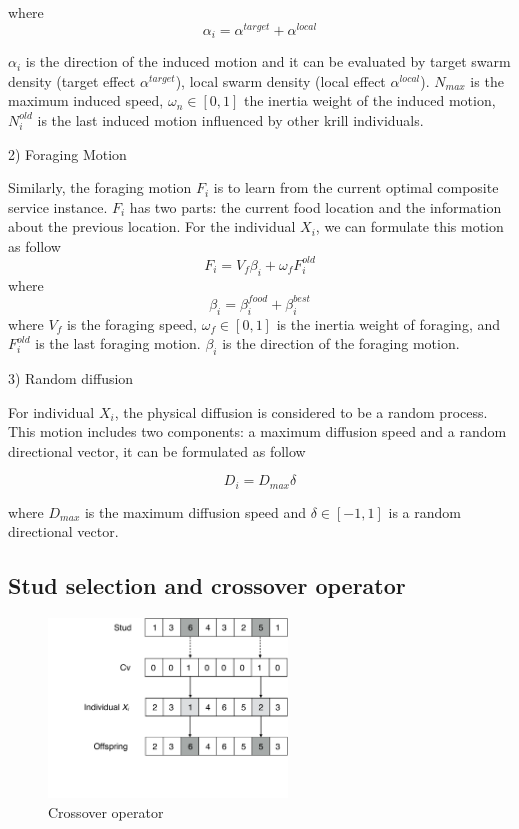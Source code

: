 \documentclass[journal]{IEEEtran}
\begin{document}
where
\begin{equation}
\alpha_i = \alpha^{target} + \alpha^{local}
\end{equation}

$\alpha_i$ is the direction of the induced motion and it can be evaluated by target swarm density (target effect $\alpha^{target}$), local swarm density (local effect $\alpha^{local}$). $N_{max}$ is the maximum induced speed, $\omega_n \in [0, 1]$ the inertia weight of the induced motion, $N^{old}_{i}$ is the last induced motion influenced by other krill individuals.

2) Foraging Motion

Similarly, the foraging motion $F_i$ is to learn from the current optimal composite service instance. 
$F_i$ has two parts: the current food location and the information about the previous location. 
For the individual $X_i$, we can formulate this motion as follow
\begin{equation}
F_i = V_f\beta_i + \omega_f F^{old}_i
\end{equation}
where
\begin{equation}
\beta_i = \beta_i^{food}+\beta_i^{best}
\end{equation}
where $V_f$ is the foraging speed, $\omega_f \in [0, 1]$ is the inertia weight of foraging, and $F^{old}_i$ is the last foraging motion. $\beta_i$ is the direction of the foraging motion.

3) Random diffusion

For individual $X_i$, the physical diffusion is considered to be a random process. This motion includes two components: a maximum diffusion speed and a random directional vector, it can be formulated as follow

\begin{equation}
D_i = D_{max}\delta
\end{equation}

where $D_{max}$ is the maximum diffusion speed and $\delta \in [-1, 1]$ is a random directional vector.

\subsection{Stud selection and crossover operator}

\begin{figure}[!t]
\centering
\includegraphics[width=2.5in]{./img/pic5.pdf}
\caption{Crossover operator}
\label{Crossover operator}
\end{figure}
\end{document}
